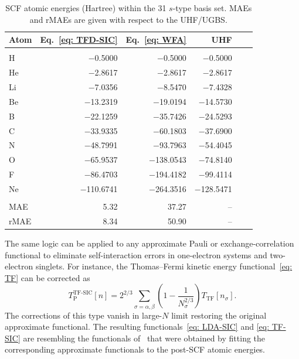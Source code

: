 \documentclass[%
 reprint,
 amsmath,amssymb,
 aps,
pra,
]{revtex4-2}
\begin{document}
\begin{table}[htb]
\caption{SCF atomic energies (Hartree) within the 31 $s$-type basis set. MAEs and rMAEs are given with respect to the UHF/UGBS.}
\begin{ruledtabular}
\begin{tabular}{lrrrrr}
Atom & Eq.~\eqref{eq: TFD-SIC} & Eq.~\eqref{eq: WFA} & UHF \\[2pt]
\hline\\[-9pt]
H     & $-$0.5000   & $-$0.5000   & $-$0.5000   \\[1.5pt]
He    & $-$2.8617   & $-$2.8617   & $-$2.8617   \\[1.5pt]
Li    & $-$7.0356   & $-$8.5470   & $-$7.4328   \\[1.5pt]
Be    & $-$13.2319  & $-$19.0194  & $-$14.5730  \\[1.5pt]
B     & $-$22.1259  & $-$35.7426  & $-$24.5293  \\[1.5pt]
C     & $-$33.9335  & $-$60.1803  & $-$37.6900  \\[1.5pt]
N     & $-$48.7991  & $-$93.7963  & $-$54.4045  \\[1.5pt]
O     & $-$65.9537  & $-$138.0543  & $-$74.8140  \\[1.5pt]
F     & $-$86.4703 & $-$194.4182 & $-$99.4114  \\[1.5pt]
Ne    & $-$110.6741 & $-$264.3516 & $-$128.5471 \\[1.5pt]
\hline\\[-9pt]
MAE & 5.32 & 37.27 & -- \\[1.5pt]
rMAE & 8.34 & 50.90 & -- \\
\end{tabular}
\end{ruledtabular}
\end{table}

The same logic can be applied to any approximate Pauli or exchange-correlation functional to eliminate self-interaction errors in one-electron systems and two-electron singlets. For instance, the Thomas--Fermi kinetic energy functional~\eqref{eq: TF} can be corrected as
\begin{equation}\label{eq: TF-SIC}
    T^{\text{TF-SIC}}_{\text{P}}[n]
    =
    2^{2/3}
    \sum_{\sigma=\alpha,\beta}
    \left(
        1 - \frac{1}{N_{\sigma}^{2/3}}
    \right)
    T_{\text{TF}}[n_{\sigma}].
\end{equation}
The corrections of this type vanish in large-$N$ limit restoring the original approximate functional. The resulting functionals~\eqref{eq: LDA-SIC} and \eqref{eq: TF-SIC} are resembling the functionals of~\cite{Acharya.1980.PNAS.77.6978,Cedillo.1986.JCP.85.7188} that were obtained by fitting the corresponding approximate functionals to the post-SCF atomic energies.
\end{document}
